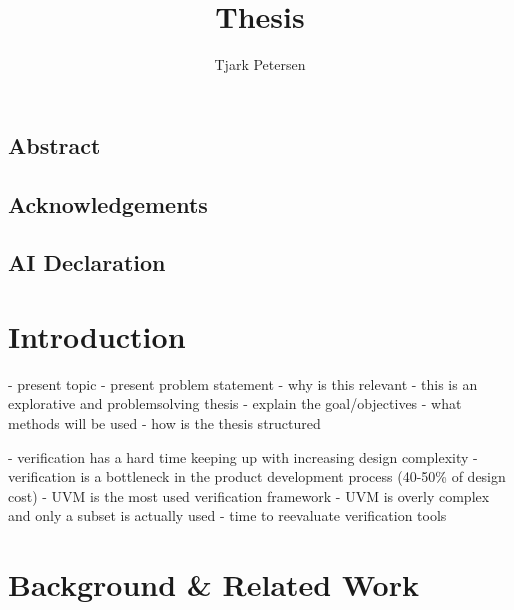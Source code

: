 \documentclass[12pt]{report}
\author{Tjark Petersen}
\title{Thesis}
\begin{document}
\maketitle

\section*{Abstract} %

\section*{Acknowledgements} %

\section*{AI Declaration} %

\newpage

\tableofcontents

\chapter{Introduction} %

- present topic
- present problem statement
- why is this relevant
- this is an explorative and problemsolving thesis
- explain the goal/objectives
- what methods will be used
- how is the thesis structured

- verification has a hard time keeping up with increasing design complexity
- verification is a bottleneck in the product development process (40-50\% of design cost) \cite{mehta2018asic}
- UVM is the most used verification framework
- UVM is overly complex and only a subset is actually used \cite{sutherland2015uvm}
- time to reevaluate verification tools

\chapter{Background \& Related Work} %
\end{document}

